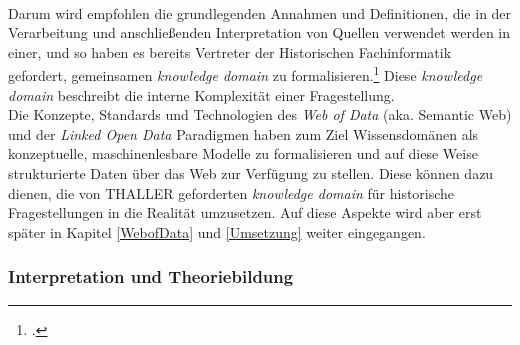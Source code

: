 \documentclass[12pt,a4paper]{article}
\begin{document}
\\
Darum wird empfohlen die grundlegenden Annahmen und Definitionen, die in der Verarbeitung und anschließenden Interpretation von Quellen verwendet werden in einer, und so haben es bereits Vertreter der Historischen Fachinformatik gefordert, gemeinsamen \textit{knowledge domain} zu formalisieren.\footcite[][S.263]{thaller2017historical} Diese \textit{knowledge domain} beschreibt die interne Komplexität einer Fragestellung.
\\
Die Konzepte, Standards und Technologien des \textit{Web of Data} (aka. Semantic Web) und der \textit{Linked Open Data} Paradigmen haben zum Ziel Wissensdomänen als konzeptuelle, maschinenlesbare Modelle zu formalisieren und auf diese Weise strukturierte Daten über das Web zur Verfügung zu stellen. Diese können dazu dienen, die von THALLER geforderten \textit{knowledge domain} für historische Fragestellungen in die Realität umzusetzen. Auf diese Aspekte wird aber erst später in Kapitel \ref{WebofData} und \ref{Umsetzung} weiter eingegangen.

\subsubsection{Interpretation und Theoriebildung}
\end{document}
